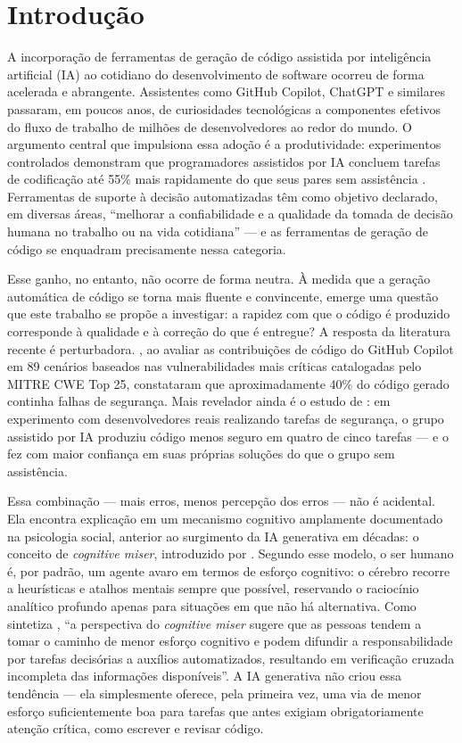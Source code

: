 \chapter{Introdução}

A incorporação de ferramentas de geração de código assistida por inteligência artificial (IA) ao cotidiano do desenvolvimento de software ocorreu de forma acelerada e abrangente. Assistentes como GitHub Copilot, ChatGPT e similares passaram, em poucos anos, de curiosidades tecnológicas a componentes efetivos do fluxo de trabalho de milhões de desenvolvedores ao redor do mundo. O argumento central que impulsiona essa adoção é a produtividade: experimentos controlados demonstram que programadores assistidos por IA concluem tarefas de codificação até 55\% mais rapidamente do que seus pares sem assistência \cite{peng2023}. Ferramentas de suporte à decisão automatizadas têm como objetivo declarado, em diversas áreas, ``melhorar a confiabilidade e a qualidade da tomada de decisão humana no trabalho ou na vida cotidiana'' \cite{mosier1998} — e as ferramentas de geração de código se enquadram precisamente nessa categoria.

Esse ganho, no entanto, não ocorre de forma neutra. À medida que a geração automática de código se torna mais fluente e convincente, emerge uma questão que este trabalho se propõe a investigar: a rapidez com que o código é produzido corresponde à qualidade e à correção do que é entregue? A resposta da literatura recente é perturbadora. , ao avaliar as contribuições de código do GitHub Copilot em 89 cenários baseados nas vulnerabilidades mais críticas catalogadas pelo MITRE CWE Top 25, constataram que aproximadamente 40\% do código gerado continha falhas de segurança. Mais revelador ainda é o estudo de : em experimento com desenvolvedores reais realizando tarefas de segurança, o grupo assistido por IA produziu código menos seguro em quatro de cinco tarefas — e o fez com maior confiança em suas próprias soluções do que o grupo sem assistência.

Essa combinação — mais erros, menos percepção dos erros — não é acidental. Ela encontra explicação em um mecanismo cognitivo amplamente documentado na psicologia social, anterior ao surgimento da IA generativa em décadas: o conceito de \textit{cognitive miser}, introduzido por . Segundo esse modelo, o ser humano é, por padrão, um agente avaro em termos de esforço cognitivo: o cérebro recorre a heurísticas e atalhos mentais sempre que possível, reservando o raciocínio analítico profundo apenas para situações em que não há alternativa. Como sintetiza , ``a perspectiva do \textit{cognitive miser} sugere que as pessoas tendem a tomar o caminho de menor esforço cognitivo e podem difundir a responsabilidade por tarefas decisórias a auxílios automatizados, resultando em verificação cruzada incompleta das informações disponíveis''. A IA generativa não criou essa tendência — ela simplesmente oferece, pela primeira vez, uma via de menor esforço suficientemente boa para tarefas que antes exigiam obrigatoriamente atenção crítica, como escrever e revisar código.

